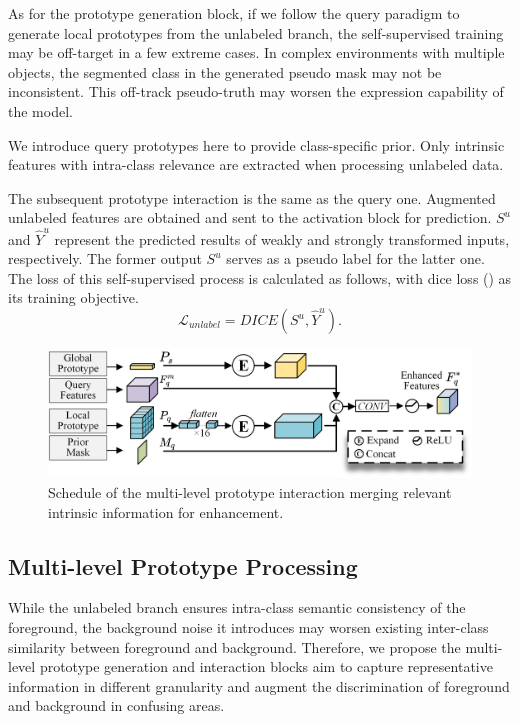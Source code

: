 \documentclass[letterpaper]{article} %
\begin{document}
As for the prototype generation block, if we follow the query paradigm to generate local prototypes from the unlabeled branch, the self-supervised training may be off-target in a few extreme cases. In complex environments with multiple objects, the segmented class in the generated pseudo mask may not be inconsistent. This off-track pseudo-truth may worsen the expression capability of the model.

We introduce query prototypes here to provide class-specific prior. Only intrinsic features with intra-class relevance are extracted when processing unlabeled data.

The subsequent prototype interaction is the same as the query one. Augmented unlabeled features are obtained and sent to the activation block for prediction. $S^u$ and $\hat{Y}^u$ represent the predicted results of weakly and strongly transformed inputs, respectively. The former output $S^u$ serves as a pseudo label for the latter one. The loss of this self-supervised process is calculated as follows, with dice loss (\citeauthor{milletari2016v}) as its training objective.
\begin{equation}
            \mathcal{L}_{unlabel} = DICE(S^u,\hat{Y}^u).
\end{equation}%

\begin{figure}
\centering
   \includegraphics[width=\linewidth]{interaction.pdf}

   \caption{Schedule of the multi-level prototype interaction merging relevant intrinsic information for enhancement. }
\label{interaction}
\end{figure}

\subsection{Multi-level Prototype Processing}
While the unlabeled branch ensures intra-class semantic consistency of the foreground, the background noise it introduces may worsen existing inter-class similarity between foreground and background. Therefore, we propose the multi-level prototype generation and interaction blocks aim to capture representative information in different granularity and augment the discrimination of foreground and background in confusing areas.
\end{document}
